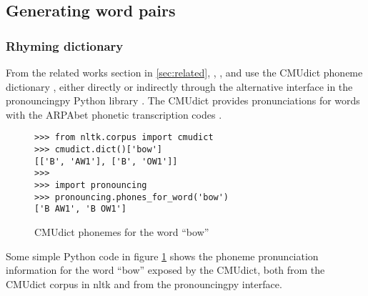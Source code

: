 \documentclass[11pt,a4paper]{article}
\begin{document}
\subsection{Generating word pairs}

\subsubsection{Rhyming dictionary}

From the related works section in \ref{sec:related}, \citet{keswarani}, \citet{cole}, and \citet{hopkins-kiela-2017} use the CMUdict phoneme dictionary \cite{cmudict}, either directly or indirectly through the alternative interface in the pronouncingpy Python library \cite{pronouncingpy}. The CMUdict provides pronunciations for words with the ARPAbet phonetic transcription codes \cite[Chapter~27]{jurafsky}.

\begin{figure}
\begin{Verbatim}[fontsize=\small]
>>> from nltk.corpus import cmudict
>>> cmudict.dict()['bow']
[['B', 'AW1'], ['B', 'OW1']]
>>>
>>> import pronouncing
>>> pronouncing.phones_for_word('bow')
['B AW1', 'B OW1']
\end{Verbatim}
\caption{CMUdict phonemes for the word ``bow''}
\label{fig:cmudict}
\end{figure}

Some simple Python code in figure \ref{fig:cmudict} shows the phoneme pronunciation information for the word ``bow'' exposed by the CMUdict, both from the CMUdict corpus in nltk and from the pronouncingpy interface.
\end{document}
